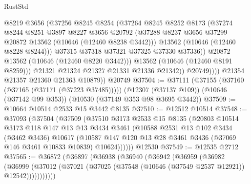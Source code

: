 \begin{lexlean}{RustStd}
\begin{coremodule}
                        @8219
                        @3656
                        (@37256
                          @8245
                          @8254
                          (@37264
                            @8245
                            @8252
                            @8173
                            (@37274
                              @8244
                              @8251
                              @3897
                              @8227
                              @3656
                              @20792
                              (@37288
                                @8237
                                @3656
                                @37299
                                @20872
                                @13562
                                (@10646 (@12460 @8238 @3442)))
                              @13562
                              (@10646 (@12460 @8228 @8244)))
                            @37315
                            @37318
                            @37321
                            @37325
                            @37330
                            @37336))
                        @20872
                        @13562
                        (@10646 (@12460 @8220 @3442)))
                      @13562
                      (@10646 (@12460 @8191 @8259)))
                    @21321
                    @21324
                    @21327
                    @21331
                    @21336
                    @21342))
                @20749))))
        @21354
        @21357
        @21360
        @21363
        @10879))
    @20749
@37504 := @37111
    (@37155 (@37160 (@37165 (@37171 (@37223 @37485)))))
    (@12307 (@37137 @109))
    (@10646 (@37142 @99 @353))
    (@10530 (@37149 @353 @98 @3695 @3442))
@37509 := @10664 @10514 @2533 @15 @3442 @8135
@37510 := @12512 @10514
@37548 := @37093
    (@37504
      (@37509
        (@37510
          @3173
          @2533
          @15
          @8135
          (@20803
            @10514
            @3173
            @118
            @147
            @13
            @13
            @3434
            @3461
            (@10588
              @2531
              @13
              @102
              @3434
              (@3462 @3436)
              @10617
              (@10587 @147 @120 @13 @28 @3461 @3436 (@37069 @146 @3461 @10833 @10839) @10624))))))
    @12530
@37549 := @12535 @2712
@37565 := @36872
    (@36897
      (@36938
        (@36940
          (@36942
            (@36959
              (@36982
                (@36999
                  (@37012 (@37021 (@37025 (@37548 (@10646 (@37549 @2537 @12921)) @12542)))))))))))

\end{coremodule}
\end{lexlean}
